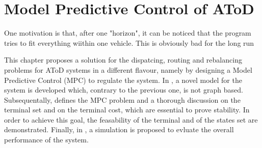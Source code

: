 \chapter{Model Predictive Control of AToD}\label{ch:mpc}

\begin{itemize}
	One motivation is that, after one "horizon", it can be noticed that the program tries to fit everything wiithin one vehicle. This is obviously bad for the long run
\end{itemize}

This chapter proposes a solution for the dispatcing, routing and rebalancing problems for AToD systems in a different flavour, namely by designing a Model Predictive Control (MPC) to regulate the system. In , a novel model for the system is developed which, contrary to the previous one, is not graph based. Subsequentally,  defines the MPC problem and a thorough discussion on the terminal set and on the terminal cost, which are essential to prove stability. In order to achieve this goal, the feasability of the terminal and of the states set are demonstrated. Finally, in , a simulation is proposed to evluate the overall performance of the system. 
